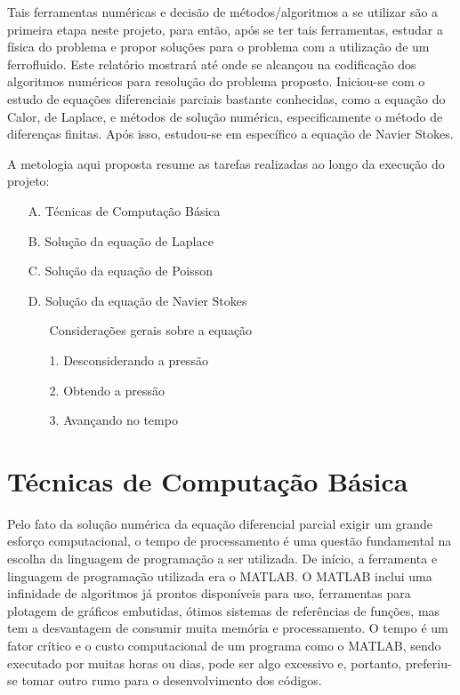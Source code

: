 \documentclass[journal]{IEEEtran}
\begin{document}
Tais ferramentas numéricas e decisão de métodos/algoritmos a se utilizar são a primeira etapa neste projeto, para então, após se ter tais ferramentas, estudar a física do problema e propor soluções para o problema com a utilização de um ferrofluido. Este relatório mostrará até onde se alcançou na codificação dos algoritmos numéricos para resolução do problema proposto. Iniciou-se com o estudo de equações diferenciais parciais bastante conhecidas, como a equação do Calor, de Laplace, e métodos de solução numérica, especificamente o método de diferenças finitas. Após isso, estudou-se em específico a equação de Navier Stokes\cite{notas_de_aula_john}.

A metologia aqui proposta resume as tarefas realizadas ao longo da execução do projeto:
\begin{enumerate}
  \item[A.] Técnicas de Computação Básica
  \item[B.] Solução da equação de Laplace
  \item[C.] Solução da equação de Poisson
  \item[D.] Solução da equação de Navier Stokes
  \begin{enumerate}
  \item [] Considerações gerais sobre a equação
  \item[1.] Desconsiderando a pressão
  \item[2.] Obtendo a pressão
  \item[3.] Avançando no tempo
  \end{enumerate}
\end{enumerate}
\section{Técnicas de Computação Básica}
Pelo fato da solução numérica da equação diferencial parcial exigir um grande esforço computacional, o tempo de processamento é uma questão fundamental na escolha da linguagem de programação a ser utilizada. De início, a ferramenta e linguagem de programação utilizada era o MATLAB\textregistered. O MATLAB inclui uma infinidade de algoritmos já prontos disponíveis para uso, ferramentas para plotagem de gráficos embutidas, ótimos sistemas de referências de funções, mas tem a desvantagem de consumir muita memória e processamento. O tempo é um fator crítico e o custo computacional de um programa como o MATLAB, sendo executado por muitas horas ou dias, pode ser algo excessivo e, portanto, preferiu-se tomar outro rumo para o desenvolvimento dos códigos.
\end{document}
